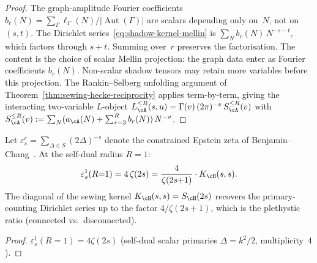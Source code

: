 \begin{proof}
The graph-amplitude Fourier coefficients
$b_r(N) = \sum_\Gamma \ell_\Gamma(N)/|\operatorname{Aut}(\Gamma)|$
are scalars depending only on~$N$, not on $(s,t)$.
The Dirichlet series~\eqref{eq:shadow-kernel-mellin}
is $\sum_N b_r(N)\,N^{-s-t}$, which factors through
$s{+}t$. Summing over~$r$ preserves the factorisation.
The content is the choice of scalar Mellin projection: the graph data
enter as Fourier coefficients $b_r(N)$. Non-scalar shadow tensors may
retain more variables before this projection.
The Rankin--Selberg unfolding argument of
Theorem~\ref{thm:sewing-hecke-reciprocity} applies
term-by-term, giving the interacting two-variable
$L$-object $L_\cA^{\leq R}(s,u) =
\Gamma(v)\,(2\pi)^{-v}\,S_\cA^{\leq R}(v)$
with $S_\cA^{\leq R}(v) := \sum_N
(a_\cA(N) + \sum_{r=3}^R b_r(N))\,N^{-v}$.
\end{proof}

\begin{proposition}[\ClaimStatusProvedHere]%
\label{prop:benjamin-chang-bridge}%
%
%
Let $\varepsilon^c_s = \sum_{\Delta \in S}(2\Delta)^{-s}$
denote the constrained Epstein zeta of
Benjamin--Chang~\cite{BenjaminChang22}.
At the self-dual radius $R = 1$:
\begin{equation}\label{eq:bc-sewing-bridge}
\varepsilon^1_s(R{=}1)
= 4\,\zeta(2s)
= \frac{4}{\zeta(2s{+}1)}\cdot K_\cH(s,s).
\end{equation}
The diagonal of the sewing kernel $K_\cH(s,s) = S_\cH(2s)$
recovers the primary-counting Dirichlet series up to the
factor $4/\zeta(2s{+}1)$, which is the plethystic ratio
\textup{(}connected vs.\ disconnected\textup{)}.
\end{proposition}

\begin{proof}
$\varepsilon^1_s(R{=}1) = 4\zeta(2s)$
(self-dual scalar primaries $\Delta = k^2/2$,
multiplicity~$4$).
\end{proof}

